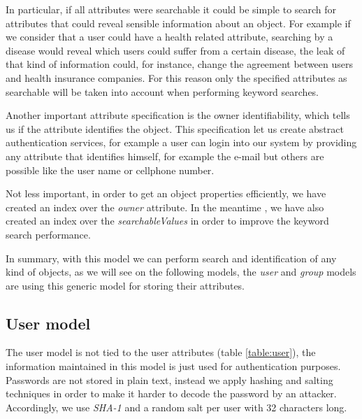 In particular, if all attributes were searchable it could be simple to search for attributes that could reveal sensible information about an object. For example if we consider that a user could have a health related attribute, searching by a disease would reveal which users could suffer from a certain disease, the leak of that kind of information could, for instance, change the agreement between users and health insurance companies. For this reason only the specified attributes as searchable will be taken into account when performing keyword searches.

Another important attribute specification is the owner identifiability, which tells us if the attribute identifies the object. This specification let us create abstract authentication services, for example a user can login into our system by providing any attribute that identifies himself, for example the e-mail but others are possible like the user name or cellphone number. 

Not less important, in order to get an object properties efficiently, we have created an index over the \emph{owner} attribute. In the meantime , we have also created an index over the \emph{searchableValues} in order to improve the keyword search performance.

In summary, with this model we can perform search and identification of any kind of objects, as we will see on the following models, the \emph{user} and \emph{group} models are using this generic model for storing their attributes. 


\subsection{User model}

The user model is not tied to the user attributes (table \ref{table:user}), the information maintained in this model is just used for authentication purposes. Passwords are not stored in plain text, instead we apply hashing and salting techniques \cite{password} in order to make it harder to decode the password by an attacker. Accordingly, we use \emph{SHA-1} and a random salt per user with 32 characters long.

